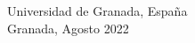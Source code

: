 \begin{titlepage}
\begin{center}
 

{\large Universidad de Granada, España\\Granada, Agosto 2022}\\[1cm] %
 
\end{center}
\end{titlepage}